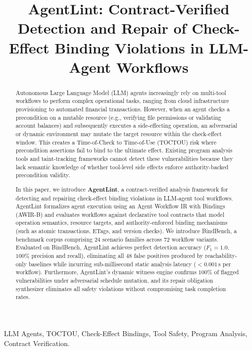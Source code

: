 \documentclass[10pt,conference,compsocconf]{IEEEtran}
\begin{document}
\title{AgentLint: Contract-Verified Detection and Repair of Check-Effect Binding Violations in LLM-Agent Workflows}

\author{
}

\maketitle

\begin{abstract}
Autonomous Large Language Model (LLM) agents increasingly rely on multi-tool workflows to perform complex operational tasks, ranging from cloud infrastructure provisioning to automated financial transactions. However, when an agent checks a precondition on a mutable resource (e.g., verifying file permissions or validating account balances) and subsequently executes a side-effecting operation, an adversarial or dynamic environment may mutate the target resource within the check-effect window. This creates a Time-of-Check to Time-of-Use (TOCTOU) risk where precondition assertions fail to bind to the ultimate effect. Existing program analysis tools and taint-tracking frameworks cannot detect these vulnerabilities because they lack semantic knowledge of whether tool-level side effects enforce authority-backed precondition validity.

In this paper, we introduce \textbf{AgentLint}, a contract-verified analysis framework for detecting and repairing check-effect binding violations in LLM-agent tool workflows. AgentLint formalizes agent execution using an Agent Workflow IR with Bindings (\textsf{AWIR-B}) and evaluates workflows against declarative tool contracts that model operation semantics, resource targets, and authority-enforced binding mechanisms (such as atomic transactions, ETags, and version checks). We introduce \textsf{BindBench}, a benchmark corpus comprising 24 scenario families across 72 workflow variants. Evaluated on \textsf{BindBench}, AgentLint achieves perfect detection accuracy ($F_1 = 1.0$, $100\%$ precision and recall), eliminating all 48 false positives produced by reachability-only baselines while incurring sub-millisecond static analysis latency ($< 0.001$\,s per workflow). Furthermore, AgentLint's dynamic witness engine confirms $100\%$ of flagged vulnerabilities under adversarial schedule mutation, and its repair obligation synthesizer eliminates all safety violations without compromising task completion rates.
\end{abstract}

\begin{IEEEkeywords}
LLM Agents, TOCTOU, Check-Effect Bindings, Tool Safety, Program Analysis, Contract Verification.
\end{IEEEkeywords}













\end{document}
